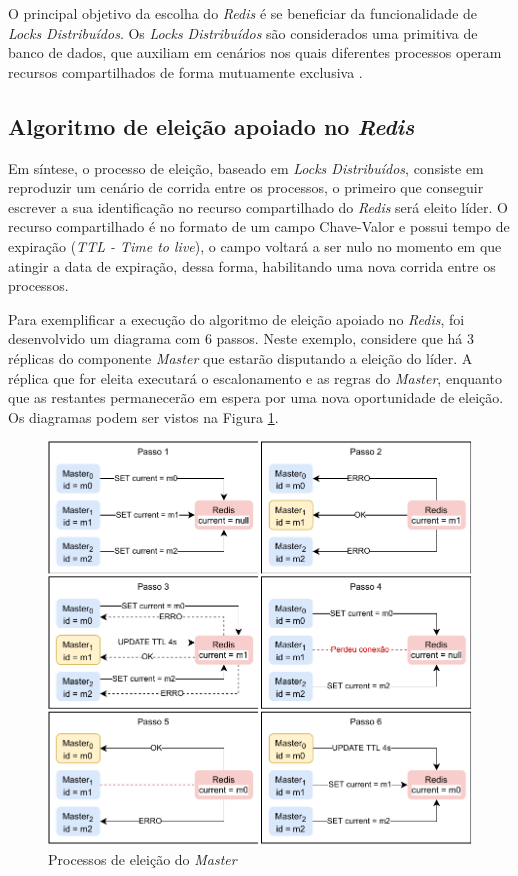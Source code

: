 O principal objetivo da escolha do \textit{Redis} é se beneficiar da funcionalidade de \textit{Locks Distribuídos}. Os \textit{Locks Distribuídos} são considerados uma primitiva de banco de dados, que auxiliam em cenários nos quais diferentes processos operam recursos compartilhados de forma mutuamente exclusiva \cite{redisDistributedLocks}.

\subsection{Algoritmo de eleição apoiado no \textit{Redis}}

Em síntese, o processo de eleição, baseado em \textit{Locks Distribuídos}, consiste em reproduzir um cenário de corrida entre os processos, o primeiro que conseguir escrever a sua identificação no recurso compartilhado do \textit{Redis} será eleito líder. O recurso compartilhado é no formato de um campo Chave-Valor e possui tempo de expiração (\textit{TTL - Time to live}), o campo voltará a ser nulo no momento em que atingir a data de expiração, dessa forma, habilitando uma nova corrida entre os processos.

Para exemplificar a execução do algoritmo de eleição apoiado no \textit{Redis}, foi desenvolvido um diagrama com 6 passos. Neste exemplo, considere que há 3 réplicas do componente \textit{Master} que estarão disputando a eleição do líder. A réplica que for eleita executará o escalonamento e as regras do \textit{Master}, enquanto que as restantes permanecerão em espera por uma nova oportunidade de eleição. Os diagramas podem ser vistos na Figura \ref{fig:eleicao-todos-os-passos}.

\begin{figure}[h!]
	\caption{\label{fig:eleicao-todos-os-passos}Processos de eleição do \textit{Master}}
	\centering
	\includegraphics[width=\linewidth]{assets/eleicao-todos-os-passos.pdf}
\end{figure}

